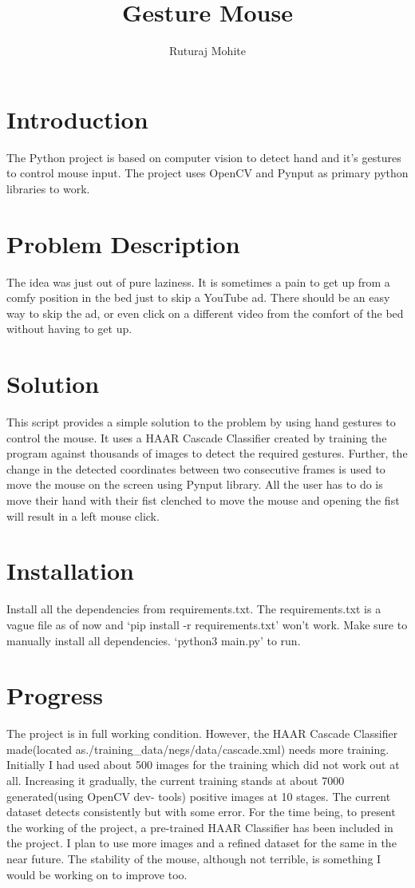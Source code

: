 \documentclass{article}
\title{Gesture Mouse}
\author{Ruturaj Mohite}
\date{}
\begin{document}
\maketitle

\section{Introduction}
The Python project is based on computer vision to detect
hand and it’s gestures to control mouse input.
The project uses OpenCV and Pynput as primary python
libraries to work.

\section{Problem Description}
The idea was just out of pure laziness. It is sometimes a
pain to get up from a comfy position in the bed just to skip
a YouTube ad. There should be an easy way to skip the ad,
or even click on a different video from the comfort of the
bed without having to get up.

\section{Solution}
This script provides a simple solution to the problem by
using hand gestures to control the mouse. It uses a HAAR
Cascade Classifier created by training the program against
thousands of images to detect the required gestures. Further,
the change in the detected coordinates between two
consecutive frames is used to move the mouse on the screen
using Pynput library. All the user has to do is move their
hand with their fist clenched to move the mouse and
opening the fist will result in a left mouse click.

\section{Installation}
Install all the dependencies from requirements.txt.
The requirements.txt is a vague file as of now and ‘pip
install -r requirements.txt’ won’t work. Make sure to
manually install all dependencies.
‘python3 main.py’ to run.

\section{Progress}
The project is in full working condition. However, the
 HAAR Cascade Classifier made(located as./training\_data/negs/data/cascade.xml)
needs more training.
Initially I had used about 500 images for the training which
did not work out at all. Increasing it gradually, the current
training stands at about 7000 generated(using OpenCV dev-
tools) positive images at 10 stages. The current dataset
detects consistently but with some error. For the time being,
to present the working of the project, a pre-trained HAAR
Classifier has been included in the project. I plan to use
more images and a refined dataset for the same in the near
future.
The stability of the mouse, although not terrible, is
something I would be working on to improve too.
\end{document}
